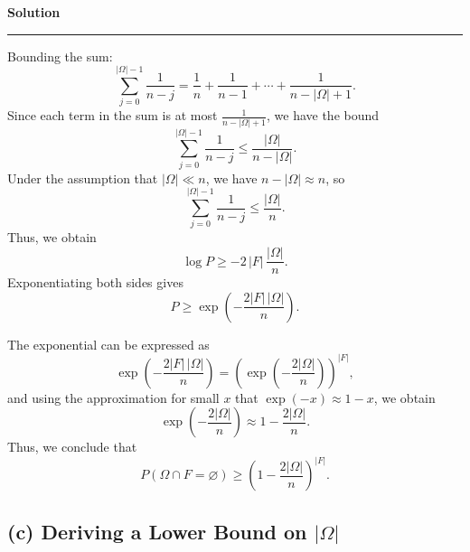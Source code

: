 \documentclass[a4paper,12pt]{article}
\newenvironment{solution}[2][]{%
    \begin{mdframed}[linecolor=blue!70!black, linewidth=2pt, roundcorner=10pt, backgroundcolor=yellow!10!white, skipabove=12pt, skipbelow=12pt]%
        \textbf{\large #2}
        \par\noindent\rule{\textwidth}{0.4pt}
}{
    \end{mdframed}
}
\begin{document}
\begin{solution}{Solution}
Bounding the sum:
\begin{equation}
\sum_{j=0}^{|\Omega|-1} \frac{1}{n-j} = \frac{1}{n} + \frac{1}{n-1} + \cdots + \frac{1}{n-|\Omega|+1}.
\end{equation}
Since each term in the sum is at most \(\displaystyle\frac{1}{n-|\Omega|+1}\), we have the bound
\begin{equation}
\sum_{j=0}^{|\Omega|-1} \frac{1}{n-j} \le \frac{|\Omega|}{n-|\Omega|}.
\end{equation}
Under the assumption that \(|\Omega|\ll n\), we have \( n-|\Omega| \approx n \), so
\begin{equation}
\sum_{j=0}^{|\Omega|-1} \frac{1}{n-j} \le \frac{|\Omega|}{n}.
\end{equation}
Thus, we obtain
\begin{equation}
\log P \ge -2\,|F|\,\frac{|\Omega|}{n}.
\end{equation}
Exponentiating both sides gives
\begin{equation}
P \ge \exp\left(-\frac{2|F|\,|\Omega|}{n}\right).
\end{equation}
 
The exponential can be expressed as
\begin{equation}
\exp\left(-\frac{2|F|\,|\Omega|}{n}\right) = \left(\exp\left(-\frac{2|\Omega|}{n}\right)\right)^{|F|},
\end{equation}
and using the approximation for small \( x \) that \(\exp(-x) \approx 1-x\), we obtain
\begin{equation}
\exp\left(-\frac{2|\Omega|}{n}\right) \approx 1-\frac{2|\Omega|}{n}.
\end{equation}
Thus, we conclude that
\begin{equation}
P\left(\Omega\cap F=\varnothing\right) \ge \left(1-\frac{2|\Omega|}{n}\right)^{|F|}.
\end{equation}

   
  \subsection*{(c) Deriving a Lower Bound on $|\Omega|$}
   

\end{solution}
\end{document}
